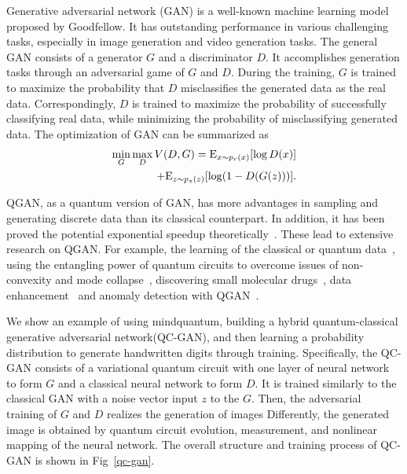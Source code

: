 Generative adversarial network (GAN) is a well-known machine learning model proposed by Goodfellow. It has outstanding performance in various challenging tasks, especially in image generation and video generation tasks. The general GAN consists of a generator ${G}$ and a discriminator ${D}$. It accomplishes generation tasks through an adversarial game of ${G}$ and ${D}$. During the training, ${G}$ is trained to maximize the probability that ${D}$ misclassifies the generated data as the real data. Correspondingly, ${D}$ is trained to maximize the probability of successfully classifying real data, while minimizing the probability of misclassifying generated data. The optimization of GAN can be summarized as
 \begin{equation}
  \begin{split}
    \mathop {\min }\limits_G \mathop {\max }\limits_D V(D,G) = {\rm{ }}{{\rm{E}}_{x\sim{p_r}(x)}}[\log D(x)] 
    \\+ {{\rm{E}}_{z\sim{p_z}(z)}}[\log (1 - D(G(z)))]. \label{eq1}
  \end{split}
\end{equation}

QGAN, as a quantum version of GAN, has more advantages in sampling and generating discrete data than its classical counterpart. In addition, it has been proved the potential exponential speedup theoretically~\cite{lloyd2018quantum}. These lead to extensive research on QGAN. For example, the learning of the classical or quantum data~\cite{benedetti2019adversarial, zeng2019learning, zoufal2019quantum,ahmed2021quantum}, using the entangling power of quantum circuits to overcome issues of non-convexity and mode collapse~\cite{niu2022entangling}, discovering small molecular drugs~\cite{li2021quantum}, data enhancement~\cite{nakaji2021quantum} and anomaly detection with QGAN~\cite{herr2021anomaly}.

We show an example of using mindquantum, building a hybrid quantum-classical generative adversarial network(QC-GAN), and then learning a probability distribution to generate handwritten digits through training. Specifically, the QC-GAN consists of a variational quantum circuit with one layer of neural network to form ${G}$ and a classical neural network to form ${D}$. It is trained similarly to the classical GAN with a noise vector input ${z}$ to the ${G}$. Then, the adversarial training of ${G}$ and ${D}$ realizes the generation of images
Differently, the generated image is obtained by quantum circuit evolution, measurement, and nonlinear mapping of the neural network. The overall structure and training process of QC-GAN is shown in Fig~\ref{qc-gan}. 

